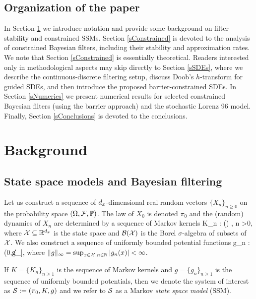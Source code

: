 \documentclass[onefignum,onetabnum]{siamonline250211}%
\begin{document}
%
\subsection{Organization of the paper}

In Section \ref{sBackground} we introduce notation and provide some background on filter stability and constrained SSMs. Section \ref{sConstrained} is devoted to the analysis of constrained Bayesian filters, including their stability and approximation rates. %
We note that Section \ref{sConstrained} is essentially theoretical. Readers interested only in methodological aspects may skip directly to Section \ref{sSDEs}, where we describe the continuous-discrete filtering setup, discuss Doob's $h$-transform for guided SDEs, and then introduce the proposed barrier-constrained SDEs. In Section \ref{sNumerics} we present numerical results for selected constrained Bayesian filters (using the barrier approach) and the stochastic Lorenz 96 model. Finally, Section \ref{sConclusions} is devoted to the conclusions.



%
\section{Background} \label{sBackground}

%
\subsection{State space models and Bayesian filtering} \label{ssIntroModels}

Let us construct a sequence of $d_x$-dimensional real random vectors $\{X_n\}_{n \ge 0}$ on the probability space $(\Omega,{\mathcal F},\mathbb{P})$. The law of $X_0$ is denoted $\pi_0$ and the (random) dynamics of $X_n$ are determined by a sequence of Markov kernels 
\beq 
K_n : \mX \times \mB(\mX) \mapsto [0,1], \quad n >0,
\eeq  
where ${\mathcal X} \subseteq \mathbb{R}^{d_x}$ is the state space and ${\mathcal B}({\mathcal X})$ is the Borel $\sigma$-algebra of subsets of ${\mathcal X}$. We also construct a sequence of uniformly bounded potential functions %
\beq
g_n : \mX \mapsto (0,\|g\|_\infty],
\eeq
where $\|g\|_\infty = \sup_{x\in{\mathcal X}, n\in\mathbb{N}} |g_n(x)| < \infty$. 

\begin{definition}
If  $K=\{ K_n \}_{n \ge 1}$ is the sequence of Markov kernels and $g=\{g_n\}_{n\ge 1}$ is the sequence of uniformly bounded potentials, then we denote the system of interest as ${\mathcal S}:=(\pi_0, K, g)$ and we refer to ${\mathcal S}$ as a Markov {\em state space model} (SSM). 
\end{definition}
\end{document}
